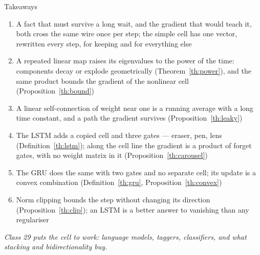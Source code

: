 \documentclass[aspectratio=169, 11pt]{beamer}
\newcommand{\bridge}[1]{%
  {\scriptsize\itshape\color{mcMuted} #1\par}\vspace{0.35em}}
\newcommand{\nosrc}{}       %
\begin{document}
\begin{frame}{Takeaways}
  \nosrc
  \vspace{-0.1em}
  {\scriptsize
  \begin{enumerate}\itemsep0.24em
    \item A fact that must survive a long wait, and the gradient that
          would teach it, both cross the same wire once per step; the
          simple cell has one vector, rewritten every step, for keeping
          and for everything else
    \item A repeated linear map raises its eigenvalues to the power of
          the time: components decay or explode geometrically
          (Theorem~\ref{th:power}), and the same product bounds the
          gradient of the nonlinear cell (Proposition~\ref{th:bound})
    \item A linear self-connection of weight near one is a running
          average with a long time constant, and a path the gradient
          survives (Proposition~\ref{th:leaky})
    \item The LSTM adds a copied cell and three gates --- eraser, pen,
          lens (Definition~\ref{th:lstm});
          along the cell line the gradient is a product of forget gates,
          with no weight matrix in it (Proposition~\ref{th:carousel})
    \item The GRU does the same with two gates and no separate cell;
          its update is a convex combination (Definition~\ref{th:gru},
          Proposition~\ref{th:convex})
    \item Norm clipping bounds the step without changing its direction
          (Proposition~\ref{th:clip}); an LSTM is a better answer to
          vanishing than any regulariser
  \end{enumerate}}
  \vspace{-0.2em}
  \bridge{Class 29 puts the cell to work: language models, taggers,
  classifiers, and what stacking and bidirectionality buy.}
\end{frame}
\end{document}
